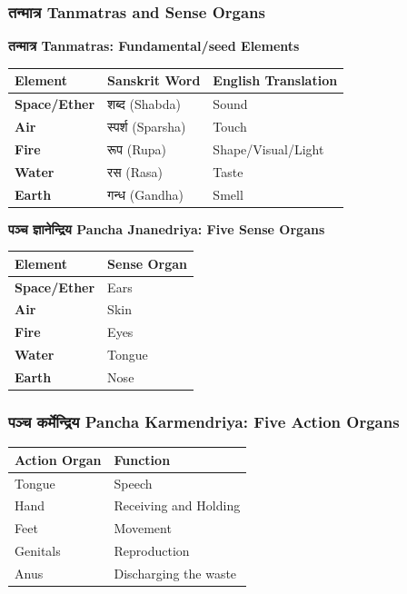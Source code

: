 \begin{frame}[fragile]\frametitle{तन्मात्र Tanmatras and Sense Organs}
    \textbf{तन्मात्र Tanmatras: Fundamental/seed Elements}
	
	
    \begin{tabular}{|l|l|l|}
    \hline
    \textbf{Element} & \textbf{Sanskrit Word} & \textbf{English Translation} \\
    \hline
    \textbf{Space/Ether} & शब्द (Shabda) & Sound \\
    \hline
    \textbf{Air} & स्पर्श (Sparsha) & Touch \\
    \hline
    \textbf{Fire} & रूप (Rupa) & Shape/Visual/Light \\
    \hline
    \textbf{Water} & रस (Rasa) & Taste \\
    \hline
    \textbf{Earth} & गन्ध (Gandha) & Smell \\
    \hline
    \end{tabular}


    \textbf{पञ्च  ज्ञानेन्द्रिय  Pancha Jnanedriya: Five Sense Organs}
	
    \begin{tabular}{|l|l|}
    \hline
    \textbf{Element} & \textbf{Sense Organ} \\
    \hline
    \textbf{Space/Ether} & Ears \\
    \hline
    \textbf{Air} & Skin \\
    \hline
    \textbf{Fire} & Eyes \\
    \hline
    \textbf{Water} & Tongue \\
    \hline
    \textbf{Earth} & Nose \\
    \hline
    \end{tabular}
\end{frame}

\begin{frame}[fragile]\frametitle{पञ्च कर्मेन्द्रिय Pancha Karmendriya: Five Action Organs}
    \begin{tabular}{|l|l|}
    \hline
    \textbf{Action Organ} & \textbf{Function} \\
    \hline
    Tongue & Speech \\
    \hline
    Hand & Receiving and Holding \\
    \hline
    Feet & Movement \\
    \hline
    Genitals & Reproduction \\
    \hline
    Anus & Discharging the waste \\
    \hline
    \end{tabular}
\end{frame}

